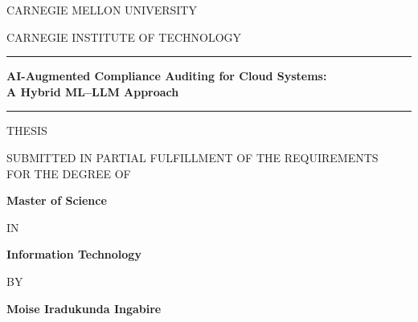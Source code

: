 \documentclass[12pt,oneside]{report}
\begin{document}
\graphicspath{{./}{poster_figures/}}

\begin{titlepage}
\begin{center}
\vspace*{0.5in}

{\large CARNEGIE MELLON UNIVERSITY}

\vspace{0.3in}

{\large CARNEGIE INSTITUTE OF TECHNOLOGY}

\vspace{0.5in}

\rule{\textwidth}{1pt}

\vspace{0.3in}

{\large\bfseries AI-Augmented Compliance Auditing for Cloud Systems:\\[6pt]
A Hybrid ML--LLM Approach}

\vspace{0.3in}

\rule{\textwidth}{1pt}

\vspace{0.5in}

{\large THESIS}

\vspace{0.3in}

{\large SUBMITTED IN PARTIAL FULFILLMENT OF THE REQUIREMENTS\\
FOR THE DEGREE OF}

\vspace{0.3in}

{\large\bfseries Master of Science}

\vspace{0.3in}

{\large IN}

\vspace{0.3in}

{\large\bfseries Information Technology}

\vspace{0.5in}

{\large BY}

\vspace{0.3in}

{\large\bfseries Moise Iradukunda Ingabire}

\vspace{0.5in}


\end{center}
\end{titlepage}
\end{document}

